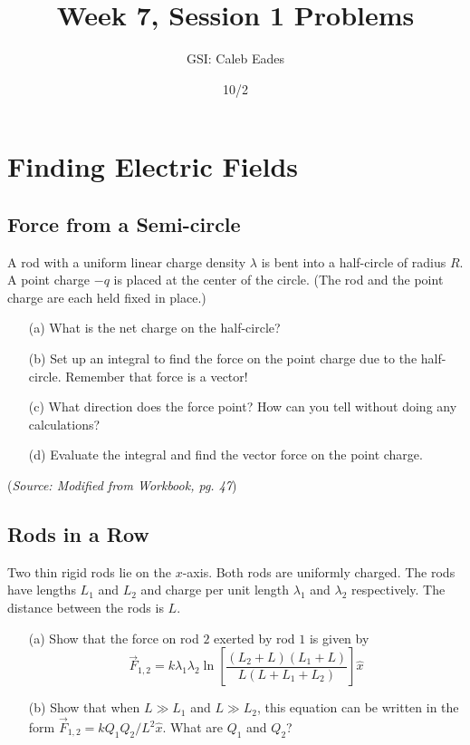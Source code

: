 \documentclass{article}
\begin{document}
\title{Week 7, Session 1 Problems}
\author{GSI: Caleb Eades}
\date{10/2}
\maketitle

\section{Finding Electric Fields}

\subsection{Force from a Semi-circle}

A rod with a uniform linear charge density $\lambda$ is bent into a half-circle of radius $R$. A point charge $-q$ is placed at the center of the circle. (The rod and the point charge are each held fixed in place.)
\begin{itemize}
	\item[(a)] What is the net charge on the half-circle?
	\item[(b)] Set up an integral to find the force on the point charge due to the half-circle. Remember that force is a vector!
	\item[(c)] What direction does the force point? How can you tell without doing any calculations?
	\item[(d)] Evaluate the integral and find the vector force on the point charge.
\end{itemize}

(\textit{Source: Modified from Workbook, pg. 47})

\subsection{Rods in a Row}

Two thin rigid rods lie on the $x$-axis. Both rods are uniformly charged. The rods have lengths $L_1$ and $L_2$ and charge per unit length $\lambda_1$ and $\lambda_2$ respectively. The distance between the rods is $L$.
\begin{itemize}
	\item[(a)] Show that the force on rod $2$ exerted by rod $1$ is given by
	\begin{equation}
	\vec{F}_{1,2} = k \lambda_1 \lambda_2 \ln\left[ \frac{(L_2 + L)(L_1 + L)}{L(L+L_1+L_2)} \right]\hat{x}
	\end{equation}
	\item[(b)] Show that when $L \gg L_1$ and $L \gg L_2$, this equation can be written in the form
	$\vec{F}_{1,2} = k Q_1 Q_2 / L^2\hat{x}$.
	What are $Q_1$ and $Q_2$?
\end{itemize}
\end{document}
